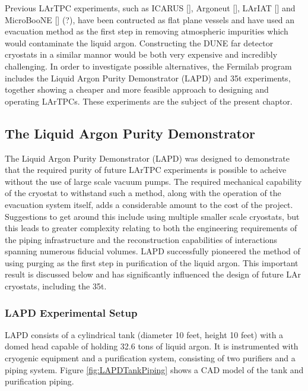Previous LArTPC experiments, such as ICARUS [], Argoneut [], LArIAT [] and MicroBooNE [] (?), have been contructed as flat plane vessels and have used an evacuation method as the first step in removing atmospheric impurities which would contaminate the liquid argon.  Constructing the DUNE far detector cryostats in a similar mannor would be both very expensive and incredibly challenging.  In order to investigate possible alternatives, the Fermilab program includes the Liquid Argon Purity Demonstrator (LAPD) and 35t experiments, together showing a cheaper and more feasible approach to designing and operating LArTPCs.  These experiments are the subject of the present chaptor.

\subsection{The Liquid Argon Purity Demonstrator}\label{sec:LAPD}

The Liquid Argon Purity Demonstrator (LAPD) \cite{LAPD} was designed to demonstrate that the required purity of future LArTPC experiments is possible to acheive without the use of large scale vacuum pumps.  The required mechanical capability of the cryostat to withstand such a method, along with the operation of the evacuation system itself, adds a considerable amount to the cost of the project.  Suggestions to get around this include using multiple smaller scale cryostats, but this leads to greater complexity relating to both the engineering requirements of the piping infrastructure and the reconstruction capabilities of interactions spanning numerous fiducial volumes.  LAPD successfully pioneered the method of using purging as the first step in purification of the liquid argon.  This important result is discussed below and has significantly influenced the design of future LAr cryostats, including the 35t.

\subsubsection{LAPD Experimental Setup}\label{sec:LAPDExperimentalSetup}

LAPD consists of a cylindrical tank (diameter 10 feet, height 10 feet) with a domed head capable of holding 32.6 tons of liquid argon.  It is instrumented with cryogenic equipment and a purification system, consisting of two purifiers and a piping system.  Figure \ref{fig:LAPDTankPiping} shows a CAD model of the tank and purification piping.

